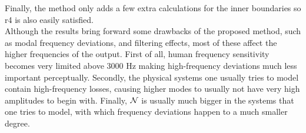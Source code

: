 Finally, the method only adds a few extra calculations for the inner boundaries so r4 is also easily satisfied. 
\\

Although the results bring forward some drawbacks of the proposed method, such as modal frequency deviations, and filtering effects, most of these affect the higher frequencies of the output. First of all, human frequency sensitivity becomes very limited above 3000 Hz \cite{Zwicker1990} making high-frequency deviations much less important perceptually. Secondly, the physical systems one usually tries to model contain high-frequency losses, causing higher modes to usually not have very high amplitudes to begin with. Finally, $\mathcal{N}$ is usually much bigger in the systems that one tries to model, with which frequency deviations happen to a much smaller degree. 

